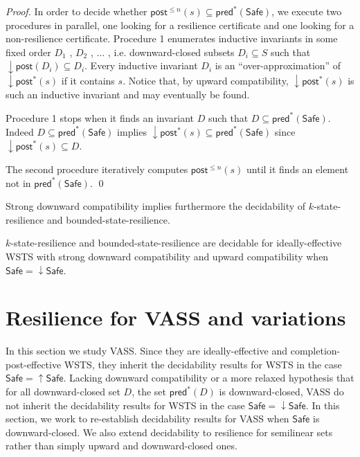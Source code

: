 \documentclass[runningheads]{llncs}
\newcommand{\pred}{\textsf{pred}}
\newcommand{\post}{\textsf{post}}
\newcommand{\Safe}{\textsf{Safe}}
\begin{document}
\begin{proof}
In order to decide whether $\post^{\leq n}(s) 
 \subseteq \pred^*(\Safe)$, we execute two procedures in parallel,
one looking for a resilience certificate and one looking for a non-resilience certificate.
Procedure 1 enumerates inductive invariants in some fixed order $D_1$ , $D_2$ , $\ldots$ , i.e. downward-closed subsets $D_i \subseteq S$ such that $\downarrow \post(D_i ) \subseteq D_i$. 
Every inductive invariant $D_i$ is an “over-approximation” of $\downarrow \post^*(s)$ if it contains $s$.
Notice that, by 
upward compatibility, $\downarrow \post^*(s)$ is such an inductive invariant and may eventually be found.

Procedure 1 stops when it finds an invariant $D$ such that
$D   \subseteq \pred^*(\Safe)$. 
Indeed
$D \subseteq  \pred^*(\Safe)$ implies
$\downarrow \post^*(s)  \subseteq  \pred^*(\Safe)$
since $ \downarrow \post^*(s)  \subseteq D$.

The second procedure iteratively computes
$\post^{\leq n}(s) $
until it finds an element
not in $\pred^*(\Safe)$. \qed
\end{proof}



Strong downward compatibility implies furthermore the decidability
of {\sc $k$-state-resilience} and {\sc bounded-state-resilience}.

\begin{corollary}\label{downward brp}
{\sc $k$-state-resilience} and {\sc bounded-state-resilience} are decidable for ideally-effective WSTS with strong downward compatibility and upward compatibility when
$\Safe = \downarrow \Safe$.
\end{corollary}





\section{Resilience for VASS and variations}\label{section VASS}

In this section we study VASS. Since they are ideally-effective and completion-post-effective WSTS, they inherit the decidability results for WSTS in the case 
$\Safe = \uparrow \Safe$. Lacking downward compatibility or a more relaxed hypothesis that
for all downward-closed set $D$, the set $\pred^*(D)$ is downward-closed, 
VASS do not inherit the decidability results for WSTS in the case $\Safe = \downarrow \Safe$.
In this section, we work to re-establish decidability results for VASS when $\Safe$ is downward-closed. We also extend decidability to resilience for semilinear sets rather than simply upward and downward-closed ones.
\end{document}
